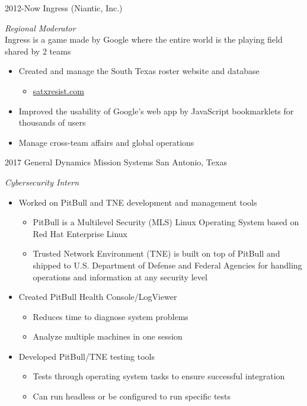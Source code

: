 \documentclass[]{friggeri-cv} %
\begin{document}
\begin{entrylist}

	\entry
	{2012-Now}
	{Ingress (Niantic, Inc.)}
	{}
	{\emph{Regional Moderator} \\
		Ingress is a game made by Google where the entire world is the playing field shared by 2 teams
		\begin{itemize}
			\item Created and manage the South Texas roster website and database
				\begin{itemize}
					\item \href{http://satxresist.com}{satxresist.com}
				\end{itemize}
			\item Improved the usability of Google's web app by JavaScript bookmarklets for thousands of users
			\item Manage cross-team affairs and global operations
		\end{itemize}
	}


	\entry
	{2017}
	{General Dynamics Mission Systems}
	{San Antonio, Texas}
	{\emph{Cybersecurity Intern}
		\begin{itemize}
			\item Worked on PitBull and TNE development and management tools
				\begin{itemize}
					\item PitBull is a Multilevel Security (MLS) Linux Operating System based on Red Hat Enterprise Linux
					\item Trusted Network Environment (TNE) is built on top of PitBull and shipped to U.S. Department of Defense and Federal Agencies for handling operations and information at any security level 
				\end{itemize}			
			\item Created PitBull Health Console/LogViewer
				\begin{itemize}
					\item Reduces time to diagnose system problems
					\item Analyze multiple machines in one session
				\end{itemize}
			\item Developed PitBull/TNE testing tools
				\begin{itemize}
					\item Tests through operating system tasks to ensure successful integration
					\item Can run headless or be configured to run specific tests
				\end{itemize} 
		\end{itemize}
	}


\end{entrylist}
\end{document}

